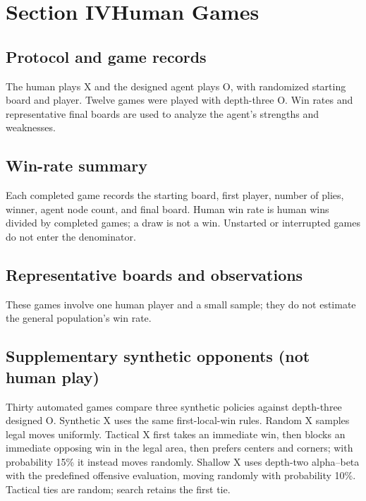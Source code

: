 \documentclass[UTF8,fontset=fandol,11pt,a4paper]{ctexart}
\begin{document}
\clearpage
\section{Section IV\quad Human Games}
\subsection{Protocol and game records}
The human plays X and the designed agent plays O, with randomized starting
board and player. Twelve games were played with depth-three O. Win rates
and representative final boards are used to analyze the agent's strengths
and weaknesses.



\begin{table}[htbp]
  \centering\small
  \caption{Human-game records. Starting boards are numbered 0--8.}
  
\end{table}

\subsection{Win-rate summary}
\begin{table}[htbp]
  \centering\small
  \caption{Summary statistics for the human experiment.}
  
\end{table}

Each completed game records the starting board, first player, number
of plies, winner, agent node count, and final board. Human win rate is
human wins divided by completed games; a draw is not a win. Unstarted or
interrupted games do not enter the denominator.

\clearpage
\subsection{Representative boards and observations}




These games involve one human player and a small sample; they do not
estimate the general population's win rate.

\clearpage
\subsection{Supplementary synthetic opponents (not human play)}
Thirty automated games compare three synthetic policies against
depth-three designed O. Synthetic X uses the same
first-local-win rules. Random X samples legal moves uniformly. Tactical
X first takes an immediate win, then blocks an immediate opposing win
in the legal area, then prefers centers and corners; with probability
15\% it instead moves randomly. Shallow X uses depth-two alpha--beta
with the predefined offensive evaluation, moving randomly with probability
10\%. Tactical ties are random; search retains the first tie.
\end{document}
